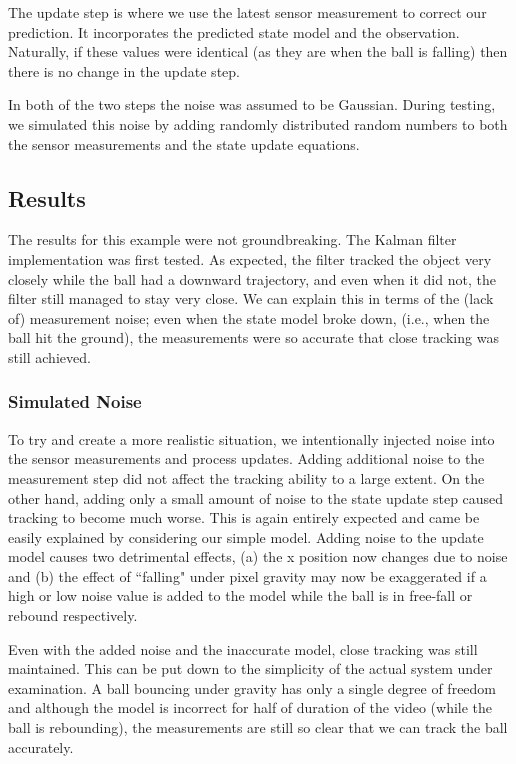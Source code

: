 The update step is where we use the latest sensor measurement to correct our
prediction. It incorporates the predicted state model and the observation. Naturally,
if these values were identical (as they are when the ball is falling)
then there is no change in the update step.

In both of the two steps the noise was assumed to be Gaussian. During testing,
we simulated this noise by adding randomly distributed random numbers to both
the sensor measurements and the state update equations.

\subsection{Results}
The results for this example were not groundbreaking. The Kalman filter
implementation was first tested. As expected, the filter
tracked the object very closely while the ball had a downward trajectory, and
even when it did not, the filter still managed to stay very close. We can explain
this in terms of the (lack of) measurement noise; even when the state model broke down,
(i.e., when the ball hit the ground), the measurements were so accurate
that close tracking was still achieved.

\subsubsection{Simulated Noise}
To try and create a more realistic situation, we intentionally injected noise into
the sensor measurements and process updates. Adding additional noise to the measurement
step did not affect the tracking ability to a large extent. On the other hand,
adding only a small amount of noise to the state update step caused tracking to
become much worse. This is again entirely expected and came be easily explained
by considering our simple model. Adding noise to the update model causes two
detrimental effects, (a) the x position now changes due to noise and (b) the
effect of ``falling" under pixel gravity may now be exaggerated if a high or low
noise value is added to the model while the ball is in free-fall or rebound respectively.

Even with the added noise and the inaccurate model, close tracking was still
maintained. This can be put down to the simplicity of the actual system under
examination. A ball bouncing under gravity has only a single degree of freedom
and although the model is incorrect for half of duration of the video (while
the ball is rebounding), the measurements are still so clear that we can track
the ball accurately.

